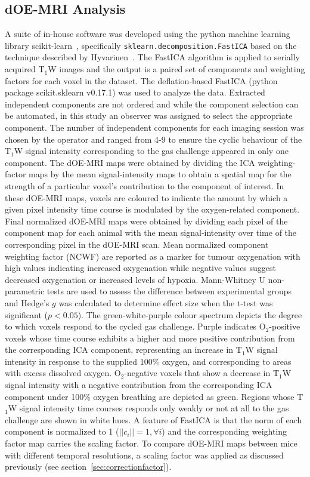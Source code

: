 \subsection{\ac{dOE-MRI} Analysis}
A suite of in-house software was developed using the python machine learning library scikit-learn~\cite{Pedregosa:2011tv}, specifically \texttt{sklearn.decomposition.FastICA} based on the technique described by Hyvarinen~\cite{Hyvarinen:2000vk}.
The Fast\ac{ICA} algorithm is applied to serially acquired T$_1$W images and the output is a paired set of components and weighting factors for each voxel in the dataset.
The deflation-based Fast\ac{ICA} (python package scikit.sklearn v0.17.1) was used to analyze the data. 
Extracted independent components are not ordered and while the component selection can be automated, in this study an observer was assigned to select the appropriate component.
The number of independent components for each imaging session was chosen by the operator and ranged from 4-9 to ensure the cyclic behaviour of the T$_1$W signal intensity corresponding to the gas challenge appeared in only one component. 
The \ac{dOE-MRI} maps were obtained by dividing the \ac{ICA} weighting-factor maps by the mean signal-intensity maps to obtain a spatial map for the strength of a particular voxel's contribution to the component of interest.
In these \ac{dOE-MRI} maps, voxels are coloured to indicate the amount by which a given pixel intensity time course is modulated by the oxygen-related component. 
Final normalized \ac{dOE-MRI} maps were obtained by dividing each pixel of the component map for each animal with the mean signal-intensity over time of the corresponding pixel in the \ac{dOE-MRI} scan. 
Mean normalized component weighting factor (\acs{NCWF}) are reported as a marker for tumour oxygenation with high values indicating increased oxygenation while negative values suggest decreased oxygenation or increased levels of hypoxia. 
Mann-Whitney U non-parametric tests are used to assess the difference between experimental groups and Hedge's $g$ was calculated to determine effect size when the t-test was significant ($p<0.05$).
The green-white-purple colour spectrum depicts the degree to which voxels respond to the cycled gas challenge.
Purple indicates O$_2$-positive voxels whose time course exhibits a higher and more positive contribution from the corresponding \ac{ICA} component, representing an increase in T$_1$W signal intensity in response to the supplied 100\% oxygen, and corresponding to areas with excess dissolved oxygen.
O$_2$-negative voxels that show a decrease in T$_1$W signal intensity with a negative contribution from the corresponding \ac{ICA} component under 100\% oxygen breathing are depicted as green. 
Regions whose T$_1$W signal intensity time courses responds only weakly or not at all to the gas challenge are shown in white hues.
A feature of Fast\ac{ICA} is that the norm of each component is normalized to 1 ($||c_i||=1, \forall i$) and the corresponding weighting factor map carries the scaling factor.
To compare \ac{dOE-MRI} maps between mice with different temporal resolutions, a scaling factor was applied as discussed previously (see section~\ref{sec:correctionfactor}).

